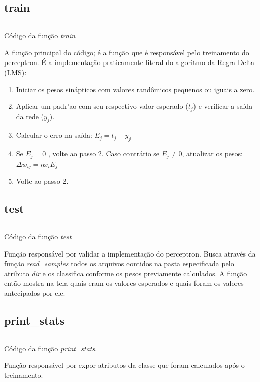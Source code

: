 \documentclass[10pt,a4paper]{article}
\begin{document}
\subsection{train}
\begin{listing}[H]
  \inputminted[fontsize=\tiny,breaklines,bgcolor=bg,linenos,breaklines,firstline=31,lastline=46]{python}{perceptron.py}
  \caption{Código da função \emph{train}}
\label{lst:train}
\end{listing}
A função principal do código; é a  função que é  responsável pelo treinamento do perceptron. É a implementação praticamente literal do algoritmo da Regra Delta (LMS):
\begin{enumerate}
  \item Iniciar os pesos sinápticos com valores randômicos pequenos ou iguais a zero.
  \item Aplicar um padr'ao com seu respectivo valor esperado ($t_j$) e verificar a saída da rede ($y_j$).
  \item Calcular o erro na saída: $E_j = t_j - y_j$
  \item Se $E_j=0$ , volte ao passo 2. Caso contrário se $E_j\neq 0$, atualizar os pesos: $\Delta w_{ij}      = \eta x_i E_j$
  \item Volte ao passo 2.
\end{enumerate}
\subsection{test}
\begin{listing}[H]
  \inputminted[fontsize=\footnotesize,breaklines,bgcolor=bg,linenos,breaklines,firstline=49,lastline=61]{python}{perceptron.py}
  \caption{Código da função \emph{test}}
\label{lst:test}
\end{listing}
Função responsável por validar a implementação do perceptron. Busca através da função \emph{read\_samples} todos os arquivos contidos na pasta especificada pelo atributo \emph{dir} e os classifica conforme os pesos previamente calculados. A função então mostra na tela quais eram os valores esperados e quais foram os valores antecipados por ele.

\subsection{print\_stats}
\begin{listing}[H]
  \inputminted[fontsize=\footnotesize,breaklines,bgcolor=bg,linenos,breaklines,firstline=63,lastline=71]{python}{perceptron.py}
  \caption{Código da função \emph{print\_stats}.}
\label{lst:test}
\end{listing}
Função responsável por expor atributos da classe que foram calculados após o treinamento.
\end{document}
